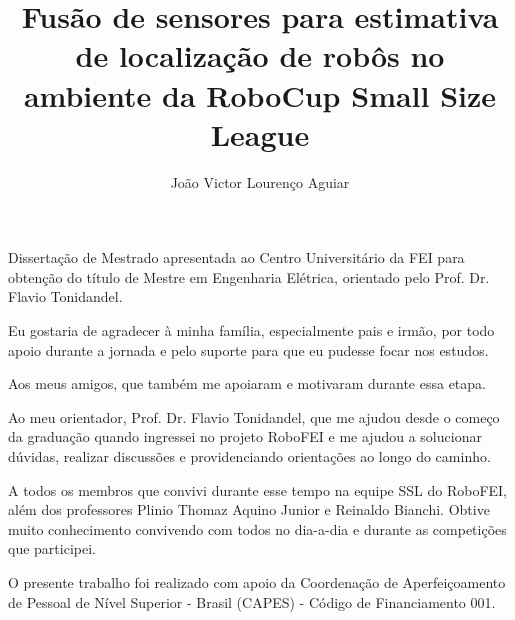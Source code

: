 \documentclass[acronym, symbols, table]{fei}
\title{Fusão de sensores para estimativa de localização de robôs no ambiente da RoboCup Small Size League}
\author{João Victor Lourenço Aguiar}
\begin{document}
	
\maketitle

\begin{folhaderosto}
	Dissertação de Mestrado apresentada ao Centro Universitário da FEI para obtenção do título de Mestre em Engenharia Elétrica, orientado pelo Prof. Dr. Flavio Tonidandel.
\end{folhaderosto}

\begin{agradecimentos}
	Eu gostaria de agradecer à minha família, especialmente pais e irmão, por todo apoio durante a jornada e pelo suporte para que eu pudesse focar nos estudos.
	
	Aos meus amigos, que também me apoiaram e motivaram durante essa etapa.
	
	Ao meu orientador, Prof. Dr. Flavio Tonidandel, que me ajudou desde o começo da graduação quando ingressei no projeto RoboFEI e me ajudou a solucionar dúvidas, realizar discussões e providenciando orientações ao longo do caminho.
	
	A todos os membros que convivi durante esse tempo na equipe SSL do RoboFEI, além dos professores Plinio Thomaz Aquino Junior e Reinaldo Bianchi. Obtive muito conhecimento convivendo com todos no dia-a-dia e durante as competições que participei.
	
	O presente trabalho foi realizado com apoio da Coordenação de Aperfeiçoamento de Pessoal de Nível Superior - Brasil (CAPES) - Código de Financiamento 001.
\end{agradecimentos}

\begin{epigrafe}
\end{epigrafe}
	
\end{document}
